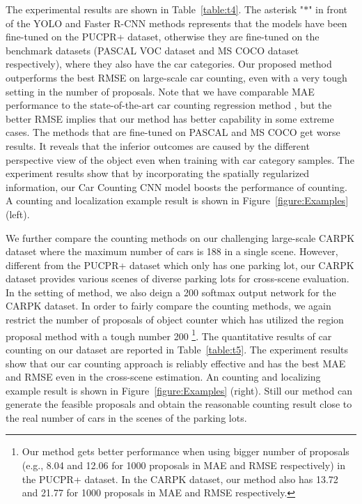 \documentclass[10pt,twocolumn,letterpaper]{article}
\begin{document}
The experimental results are shown in Table~\ref{table:t4}. The asterisk "$*$" in front of the YOLO and Faster R-CNN methods represents that the models have been fine-tuned on the PUCPR+ dataset, otherwise they are fine-tuned on the benchmark datasets (PASCAL VOC dataset and MS COCO dataset respectively), where they also have the car categories. 
%
Our proposed method outperforms the best RMSE on large-scale car counting, even with a very tough setting in the number of proposals. Note that we have comparable MAE performance to the state-of-the-art car counting regression method \cite{04_mundhenk2016large}, but the better RMSE implies that our method has better capability in some extreme cases. 
%
The methods that are fine-tuned on PASCAL and MS COCO get worse results. It reveals that the inferior outcomes are caused by the different perspective view of the object even when training with car category samples. The experiment results show that by incorporating the spatially regularized information, our Car Counting CNN model boosts the performance of counting. A counting and localization example result is shown in Figure~\ref{figure:Examples} (left).


We further compare the counting methods on our challenging large-scale CARPK dataset where the maximum number of cars is 188 in a single scene. However, different from the PUCPR+ dataset which only has one parking lot, our CARPK dataset provides various scenes of diverse parking lots for cross-scene evaluation. In the setting of \cite{04_mundhenk2016large} method, we also deign a 200 softmax output network for the CARPK dataset. In order to fairly compare the counting methods, we again restrict the number of proposals of object counter which has utilized the region proposal method with a tough number 200 \footnote{Our method gets better performance when using bigger number of proposals (e.g., 8.04 and 12.06 for 1000 proposals in MAE and RMSE respectively) in the PUCPR+ dataset. In the CARPK dataset, our method also has 13.72 and 21.77 for 1000 proposals in MAE and RMSE respectively.}. The quantitative results of car counting on our dataset are reported in Table~\ref{table:t5}. The experiment results show that our car counting approach is reliably effective and has the best MAE and RMSE even in the cross-scene estimation. An counting and localizing example result is shown in Figure~\ref{figure:Examples} (right). Still our method can generate the feasible proposals and obtain the reasonable counting result close to the real number of cars in the scenes of the parking lots.
\end{document}
